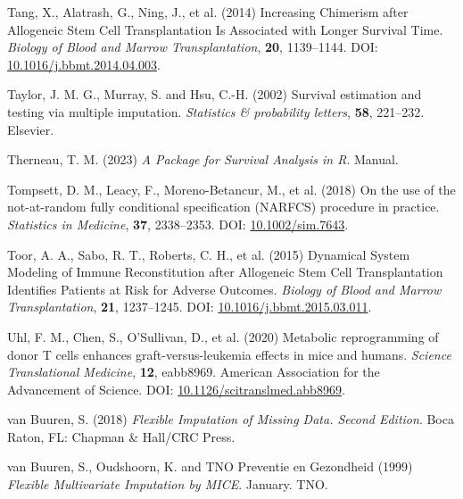\documentclass[
  letterpaper,
  DIV=11,
  numbers=noendperiod]{scrreprt}
\newlength{\cslhangindent}
\newenvironment{CSLReferences}[2] %
 {\begin{list}{}{%
  \setlength{\itemindent}{0pt}
  \setlength{\leftmargin}{0pt}
  \setlength{\parsep}{0pt}
  \ifodd #1
   \setlength{\leftmargin}{\cslhangindent}
   \setlength{\itemindent}{-1\cslhangindent}
  \fi
  \setlength{\itemsep}{#2\baselineskip}}}
 {\end{list}}
\begin{document}
\begin{CSLReferences}{1}{1}
Tang, X., Alatrash, G., Ning, J., et al. (2014) Increasing {Chimerism}
after {Allogeneic Stem Cell Transplantation Is Associated} with {Longer
Survival Time}. \emph{Biology of Blood and Marrow Transplantation},
\textbf{20}, 1139--1144. DOI:
\href{https://doi.org/10.1016/j.bbmt.2014.04.003}{10.1016/j.bbmt.2014.04.003}.

Taylor, J. M. G., Murray, S. and Hsu, C.-H. (2002) Survival estimation
and testing via multiple imputation. \emph{Statistics \& probability
letters}, \textbf{58}, 221--232. Elsevier.

Therneau, T. M. (2023) \emph{A Package for Survival Analysis in {R}}.
Manual.

Tompsett, D. M., Leacy, F., Moreno-Betancur, M., et al. (2018) On the
use of the not-at-random fully conditional specification ({NARFCS})
procedure in practice. \emph{Statistics in Medicine}, \textbf{37},
2338--2353. DOI:
\href{https://doi.org/10.1002/sim.7643}{10.1002/sim.7643}.

Toor, A. A., Sabo, R. T., Roberts, C. H., et al. (2015) Dynamical
{System Modeling} of {Immune Reconstitution} after {Allogeneic Stem Cell
Transplantation Identifies Patients} at {Risk} for {Adverse Outcomes}.
\emph{Biology of Blood and Marrow Transplantation}, \textbf{21},
1237--1245. DOI:
\href{https://doi.org/10.1016/j.bbmt.2015.03.011}{10.1016/j.bbmt.2015.03.011}.

Uhl, F. M., Chen, S., O'Sullivan, D., et al. (2020) Metabolic
reprogramming of donor {T} cells enhances graft-versus-leukemia effects
in mice and humans. \emph{Science Translational Medicine}, \textbf{12},
eabb8969. American Association for the Advancement of Science. DOI:
\href{https://doi.org/10.1126/scitranslmed.abb8969}{10.1126/scitranslmed.abb8969}.

van Buuren, S. (2018) \emph{Flexible Imputation of Missing Data.
{Second} Edition}. Boca Raton, FL: Chapman \& Hall/CRC Press.

van Buuren, S., Oudshoorn, K. and TNO Preventie en Gezondheid (1999)
\emph{Flexible {Multivariate Imputation} by {MICE}}. January. TNO.


\end{CSLReferences}
\end{document}
